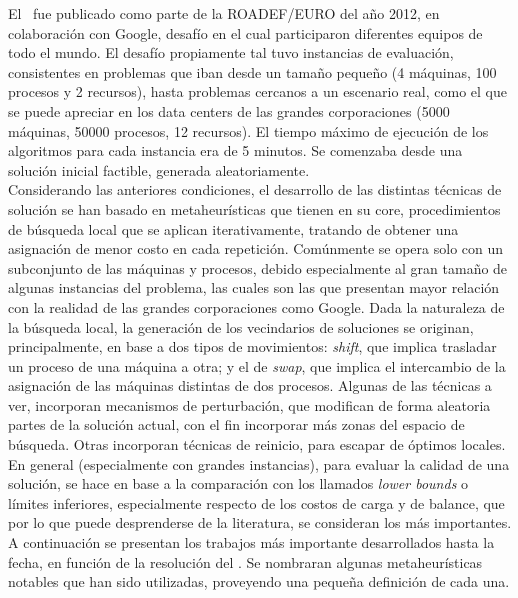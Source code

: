 \documentclass[../informe2.tex]{subfiles}
\begin{document}

El \mrp\ fue publicado como parte de la ROADEF/EURO del año 2012, en colaboración con Google, desafío en el cual participaron diferentes equipos de todo el mundo. El desafío propiamente tal tuvo instancias de evaluación, consistentes en problemas que iban desde un tamaño pequeño (4 máquinas, 100 procesos y 2 recursos), hasta problemas cercanos a un escenario real, como el que se puede apreciar en los data centers de las grandes corporaciones (5000 máquinas, 50000 procesos, 12 recursos). El tiempo máximo de ejecución de los algoritmos para cada instancia era de 5 minutos. Se comenzaba desde una solución inicial factible, generada aleatoriamente.  \\
Considerando las anteriores condiciones, el desarrollo de las distintas técnicas de solución se han basado en metaheurísticas que tienen en su core, procedimientos de búsqueda local que se aplican iterativamente, tratando de obtener una asignación de menor costo en cada repetición. Comúnmente se opera solo con un subconjunto de las máquinas y procesos, debido especialmente al gran tamaño de algunas instancias del problema, las cuales son las que presentan mayor relación con la realidad de las grandes corporaciones como Google. Dada la naturaleza de la búsqueda local, la generación de los vecindarios de soluciones se originan, principalmente, en base a dos tipos de movimientos: \textit{shift}, que implica trasladar un proceso de una máquina a otra; y el de \textit{swap}, que implica el intercambio de la asignación de las máquinas distintas de dos procesos. Algunas de las técnicas a ver, incorporan mecanismos de perturbación, que modifican de forma aleatoria partes de la solución actual, con el fin incorporar más zonas del espacio de búsqueda. Otras incorporan técnicas de reinicio, para escapar de óptimos locales. En general (especialmente con grandes instancias), para evaluar la calidad de una solución, se hace en base a la comparación con los llamados \textit{lower bounds} o límites inferiores, especialmente respecto de los costos de carga y de balance, que por lo que puede desprenderse de la literatura, se consideran los más importantes.\\
A continuación se presentan los trabajos más importante desarrollados hasta la fecha, en función de la resolución del \mrp. Se nombraran algunas metaheurísticas notables que han sido utilizadas, proveyendo una pequeña definición de cada una.
\end{document}
